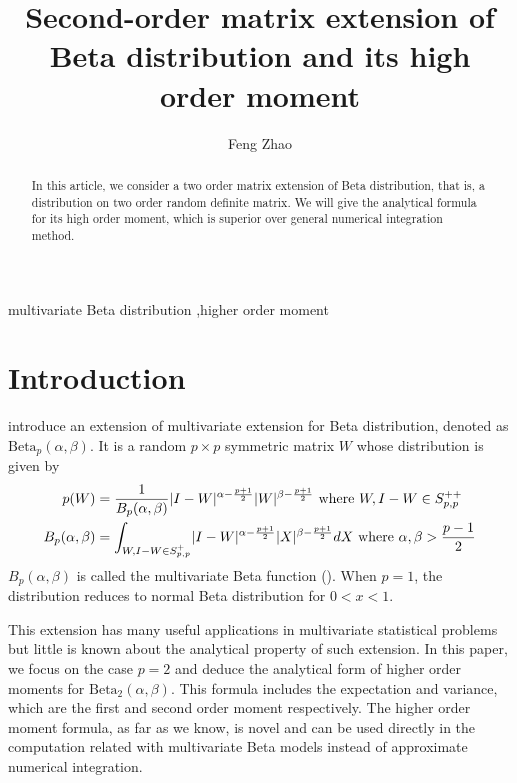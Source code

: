 \documentclass[review,authoryear]{elsarticle}
\DeclarePairedDelimiter\abs{\lvert}{\rvert}
\def\Beta{\textrm{Beta}}
\begin{document}
\begin{frontmatter}
\title{Second-order matrix extension of Beta distribution and its high order moment}
\author[1]{Feng Zhao}
\address[1]{Department of Electronic Engineering, Tsinghua University, Beijing China}

 \begin{abstract}
In this article, we consider a two order matrix extension of Beta distribution,
that is, a distribution on two order random definite matrix.
We will give the analytical
formula for its high order moment, which is superior over general
numerical integration method.
 \end{abstract}
\begin{keyword}
 multivariate Beta distribution \sep higher order moment
\end{keyword}
\end{frontmatter}
\section{Introduction}
\citet{olkin1964} introduce an extension of
multivariate extension for Beta distribution,
denoted as $\Beta_p(\alpha, \beta)$.
It is a random $p\times p$  symmetric matrix $W$ whose distribution
is given by
\begin{align}
p(W) &= \frac{1}{B_p(\alpha, \beta)}\abs{I-W}^{\alpha-\frac{p+1}{2}}
\abs{W}^{\beta-\frac{p+1}{2}} \textrm{ where } W, I-W \in S_{p,p}^{++}
\label{eq:distr}\\
B_p(\alpha, \beta) &= \int_{W,I-W \in S_{p,p}^{+} }\abs{I-W}^{\alpha-\frac{p+1}{2}}
\abs{X}^{\beta-\frac{p+1}{2}}dX \textrm{ where } \alpha, \beta > \frac{p-1}{2}
\end{align}
$B_p(\alpha, \beta)$ is called the multivariate Beta function (\citet{david1981}).
When $p=1$, the distribution reduces to normal Beta distribution for
$0<x<1$.

This extension has many useful applications in multivariate statistical
problems but little is known about the analytical property of such extension.
In this paper, we focus on the case $p=2$ and deduce the analytical form of 
higher order moments for $\Beta_2(\alpha, \beta)$. This formula
includes the expectation and variance, which are the first and second
order moment respectively. The higher order moment formula, as
far as we know, is novel and can be used directly in the computation
related with multivariate Beta models instead of approximate
numerical integration.
\end{document}
